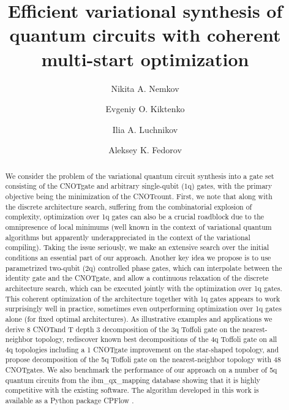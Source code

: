 \documentclass[twocolumn, amsfonts, amssymb, aps, nofootinbib]{revtex4-2}
\newcommand{\CX}{\textsf{CNOT}}
\newcommand{\T}{\textsf{T }}
\newcommand{\package}[1]{\textrm {#1 }}
\newcommand{\cpflow}{\package{CPFlow}}
\begin{document}
\title{Efficient variational synthesis of quantum circuits with coherent multi-start optimization}

\author{Nikita A. Nemkov}
\author{Evgeniy O. Kiktenko}
\author{Ilia A. Luchnikov}
\author{Aleksey K. Fedorov}

\begin{abstract}
We consider the problem of the variational quantum circuit synthesis into a gate set consisting of the \CX gate and arbitrary single-qubit (1q) gates, with the primary objective being the minimization of the \CX count. First, we note that along with the discrete architecture search, suffering from the combinatorial explosion of complexity, optimization over 1q gates can also be a crucial roadblock due to the omnipresence of local minimums (well known in the context of variational quantum algorithms but apparently underappreciated in the context of the variational compiling). Taking the issue seriously, we make an extensive search over the initial conditions an essential part of our approach.
Another key idea we propose is to use parametrized two-qubit (2q) controlled phase gates, which can interpolate between the identity gate and the \CX gate, and allow a continuous relaxation of the discrete architecture search, which can be executed jointly with the optimization over 1q gates. This coherent optimization of the architecture together with 1q gates appears to work surprisingly well in practice, sometimes even outperforming optimization over 1q gates alone (for fixed optimal architectures).
As illustrative examples and applications we derive 8 \CX and \T depth 3 decomposition of the 3q Toffoli gate on the nearest-neighbor topology, rediscover known best decompositions of the 4q Toffoli gate on all 4q topologies including a  1 \CX gate improvement on the star-shaped topology, and propose decomposition of the 5q Toffoli gate on the nearest-neighbor topology with 48 \CX gates. We also benchmark the performance of our approach on a number of 5q quantum circuits from the ibm\_qx\_mapping database showing that it is highly competitive with the existing software. The algorithm developed in this work is available as a Python package \cpflow.
\end{abstract}
\end{document}
